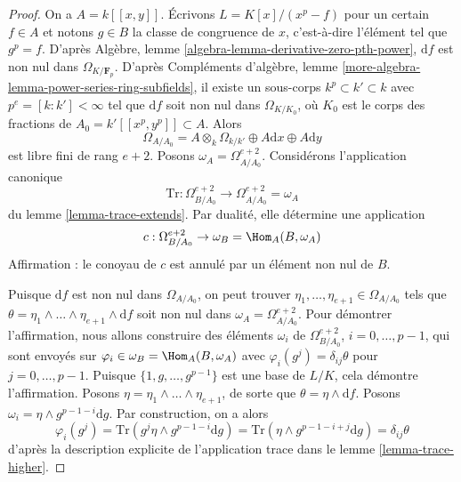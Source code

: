 \begin{proof} On a $A = k[[x, y]]$. Écrivons $L = K[x]/(x^p - f)$ pour un certain $f \in A$ et notons $g \in B$ la classe de congruence de $x$, c'est-à-dire l'élément tel que $g^p = f$. D'après Algèbre, lemme \ref{algebra-lemma-derivative-zero-pth-power}, $\text{d}f$ est non nul dans $\Omega_{K/\mathbf{F}_p}$. D'après Compléments d'algèbre, lemme \ref{more-algebra-lemma-power-series-ring-subfields}, il existe un sous-corps $k^p \subset k' \subset k$ avec $p^e = [k : k'] < \infty$ tel que $\text{d}f$ soit non nul dans $\Omega_{K/K_0}$, où $K_0$ est le corps des fractions de $A_0 = k'[[x^p, y^p]] \subset A$. Alors $$
\Omega_{A/A_0} =
A \otimes_k \Omega_{k/k'} \oplus A \text{d}x \oplus A \text{d}y
$$ est libre fini de rang $e + 2$. Posons $\omega_A = \Omega^{e + 2}_{A/A_0}$. Considérons l'application canonique $$
\text{Tr} :
\Omega^{e + 2}_{B/A_0}
\longrightarrow
\Omega^{e + 2}_{A/A_0} = \omega_A
$$ du lemme \ref{lemma-trace-extends}. Par dualité, elle détermine une application $$
c : \Omega^{e + 2}_{B/A_0} \to \omega_B = \Hom_A(B, \omega_A)
$$ Affirmation : le conoyau de $c$ est annulé par un élément non nul de $B$.

\medskip\noindent Puisque $\text{d}f$ est non nul dans $\Omega_{A/A_0}$, on peut trouver $\eta_1, \ldots, \eta_{e + 1} \in \Omega_{A/A_0}$ tels que $\theta = \eta_1 \wedge \ldots \wedge \eta_{e + 1} \wedge \text{d}f$ soit non nul dans $\omega_A = \Omega^{e + 2}_{A/A_0}$. Pour démontrer l'affirmation, nous allons construire des éléments $\omega_i$ de $\Omega^{e + 2}_{B/A_0}$, $i = 0, \ldots, p - 1$, qui sont envoyés sur $\varphi_i \in \omega_B = \Hom_A(B, \omega_A)$ avec $\varphi_i(g^j) = \delta_{ij}\theta$ pour $j = 0, \ldots, p - 1$. Puisque $\{1, g, \ldots, g^{p - 1}\}$ est une base de $L/K$, cela démontre l'affirmation. Posons $\eta = \eta_1 \wedge \ldots \wedge \eta_{e + 1}$, de sorte que $\theta = \eta \wedge \text{d}f$. Posons $\omega_i = \eta \wedge g^{p - 1 - i}\text{d}g$. Par construction, on a alors $$
\varphi_i(g^j) = \text{Tr}(g^j \eta \wedge g^{p - 1 - i}\text{d}g) =
\text{Tr}(\eta \wedge g^{p - 1 - i + j}\text{d}g) = \delta_{ij} \theta
$$ d'après la description explicite de l'application trace dans le lemme \ref{lemma-trace-higher}.


\end{proof}
